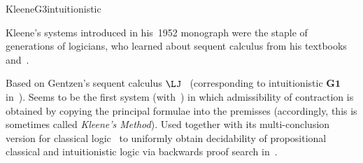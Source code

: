 \begin{entry}{KleeneG3intuitionistic}
\begin{history}
  Kleene's systems introduced in his~1952 monograph were the staple of
  generations of logicians, who learned about sequent calculus from
  his textbooks~\cite{Kleene:1952} and~\cite{Kleene:1967}.
\end{history}

\begin{technicalities}
  Based on Gentzen's sequent calculus $\LJ$~
  (corresponding to intuitionistic $\mathbf{G1}$
  in~\cite{Kleene:1952}). Seems to be the first system
  (with~) in which admissibility of
  contraction is obtained by copying the principal formulae into the
  premisses (accordingly, this is sometimes called \emph{Kleene's
    Method}). Used together with its multi-conclusion version for
  classical logic~ to uniformly obtain
  decidability of propositional classical and intuitionistic logic via
  backwards proof search in~\cite{Kleene:1952}.
\end{technicalities}









\nocite{Kleene:1952}



\end{entry}
